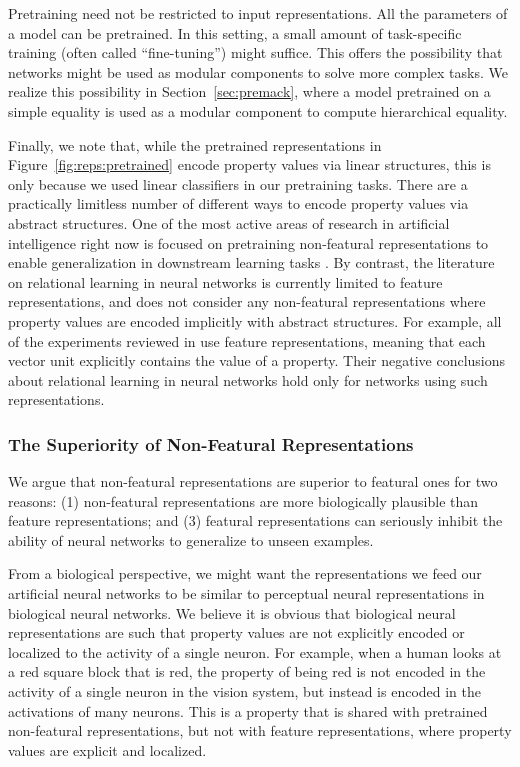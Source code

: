 \documentclass{article}
\newcommand{\secref}[1]{Section~\ref{#1}}
\newcommand{\figref}[1]{Figure~\ref{#1}}
\begin{document}
{Pretraining need not be restricted to input representations. All the parameters of a model can be pretrained. In this setting, a small amount of task-specific training (often called ``fine-tuning'') might suffice. This offers the possibility that networks might be used as modular components to solve more complex tasks. We realize this possibility in \secref{sec:premack}, where a model pretrained on a simple equality is used as a modular component to compute hierarchical equality.

Finally, we note that, while the pretrained representations in \figref{fig:reps:pretrained} encode property values via linear structures, this is only because we used linear classifiers in our pretraining tasks. There are a practically limitless number of different ways to encode property values via abstract structures. One of the most active areas of research in artificial intelligence right now is focused on pretraining non-featural representations to enable generalization in downstream learning tasks \citep{CollobertWeston:2011,Mikolov-etal:2013,pennington-socher-manning:2014:EMNLP2014,Peters-etal:2018,Devlin-etal:2019}. By contrast, the literature on relational learning in neural networks is currently limited to feature representations, and does not consider any non-featural representations where property values are encoded implicitly with abstract structures. For example, all of the experiments reviewed in \citep{alhama:2019} use feature representations, meaning that each vector unit explicitly contains the value of a property. Their negative conclusions about relational learning in neural networks hold only for networks using such representations.


\subsubsection{The Superiority of Non-Featural Representations}

We argue that non-featural representations are superior to featural ones for two reasons: (1) non-featural representations are more biologically plausible than feature representations; and (3) featural representations can seriously inhibit the ability of neural networks to generalize to unseen examples.

From a biological perspective, we might want the representations we feed our artificial neural networks to be similar to perceptual neural representations in biological neural networks. We believe it is obvious that biological neural representations are such that property values are not explicitly encoded or localized to the activity of a single neuron. For example, when a human looks at a red square block that is red, the property of being red is not encoded in the activity of a single neuron in the vision system, but instead is encoded in the activations of many neurons. This is a property that is shared with pretrained non-featural representations, but not with feature representations, where property values are explicit and localized.

}
\end{document}
